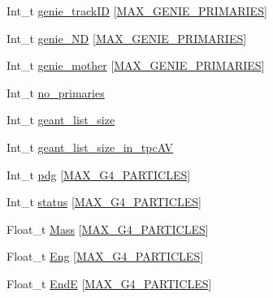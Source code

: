 \begin{DoxyCompactItemize}
\item 
Int\-\_\-t \hyperlink{classanatree_ae20891e57fed156ef6a66f1269cb56f6}{genie\-\_\-track\-I\-D} \mbox{[}\hyperlink{anatree__core__v09410002__orig_8h_a2b21972a7445ecb7aae4c92a9c5ae1fa}{M\-A\-X\-\_\-\-G\-E\-N\-I\-E\-\_\-\-P\-R\-I\-M\-A\-R\-I\-E\-S}\mbox{]}
\item 
Int\-\_\-t \hyperlink{classanatree_aa04ad329f56a1064b75721c6ba02ec32}{genie\-\_\-\-N\-D} \mbox{[}\hyperlink{anatree__core__v09410002__orig_8h_a2b21972a7445ecb7aae4c92a9c5ae1fa}{M\-A\-X\-\_\-\-G\-E\-N\-I\-E\-\_\-\-P\-R\-I\-M\-A\-R\-I\-E\-S}\mbox{]}
\item 
Int\-\_\-t \hyperlink{classanatree_a8e1f5074bd06e73c1c4bbdd9fd9bb129}{genie\-\_\-mother} \mbox{[}\hyperlink{anatree__core__v09410002__orig_8h_a2b21972a7445ecb7aae4c92a9c5ae1fa}{M\-A\-X\-\_\-\-G\-E\-N\-I\-E\-\_\-\-P\-R\-I\-M\-A\-R\-I\-E\-S}\mbox{]}
\item 
Int\-\_\-t \hyperlink{classanatree_a76c6d8514cd78c8dd50ce0334e1c4d0b}{no\-\_\-primaries}
\item 
Int\-\_\-t \hyperlink{classanatree_a455af43b0d2a4febeb56b786b5ffa084}{geant\-\_\-list\-\_\-size}
\item 
Int\-\_\-t \hyperlink{classanatree_acca0dc16c2c962a20caff12197e3345d}{geant\-\_\-list\-\_\-size\-\_\-in\-\_\-tpc\-A\-V}
\item 
Int\-\_\-t \hyperlink{classanatree_a309376b30f569539cf8a46be0fd3330e}{pdg} \mbox{[}\hyperlink{anatree__core__v09410002__orig_8h_aa5cbba5cc53c011e88805f38503de894}{M\-A\-X\-\_\-\-G4\-\_\-\-P\-A\-R\-T\-I\-C\-L\-E\-S}\mbox{]}
\item 
Int\-\_\-t \hyperlink{classanatree_a09a0173443fb9f8fe2991367ff7ed973}{status} \mbox{[}\hyperlink{anatree__core__v09410002__orig_8h_aa5cbba5cc53c011e88805f38503de894}{M\-A\-X\-\_\-\-G4\-\_\-\-P\-A\-R\-T\-I\-C\-L\-E\-S}\mbox{]}
\item 
Float\-\_\-t \hyperlink{classanatree_a6acdd2c8c51383e29eab40fa56464b0c}{Mass} \mbox{[}\hyperlink{anatree__core__v09410002__orig_8h_aa5cbba5cc53c011e88805f38503de894}{M\-A\-X\-\_\-\-G4\-\_\-\-P\-A\-R\-T\-I\-C\-L\-E\-S}\mbox{]}
\item 
Float\-\_\-t \hyperlink{classanatree_a09524750f273198e0a44997bbfea3b7a}{Eng} \mbox{[}\hyperlink{anatree__core__v09410002__orig_8h_aa5cbba5cc53c011e88805f38503de894}{M\-A\-X\-\_\-\-G4\-\_\-\-P\-A\-R\-T\-I\-C\-L\-E\-S}\mbox{]}
\item 
Float\-\_\-t \hyperlink{classanatree_a7c87aaf34c469a1bb405c859379ce971}{End\-E} \mbox{[}\hyperlink{anatree__core__v09410002__orig_8h_aa5cbba5cc53c011e88805f38503de894}{M\-A\-X\-\_\-\-G4\-\_\-\-P\-A\-R\-T\-I\-C\-L\-E\-S}\mbox{]}

\end{DoxyCompactItemize}

